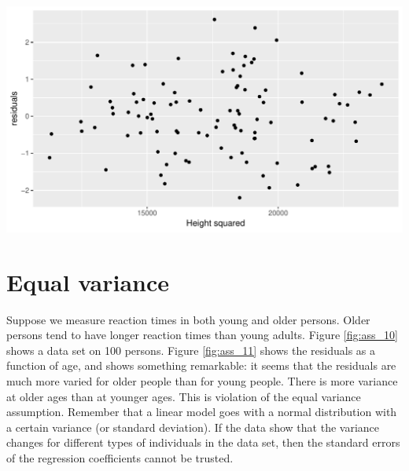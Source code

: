 \documentclass[]{report}\usepackage[]{graphicx}\usepackage[]{color}
\makeatletter
\def\maxwidth{ %
  \ifdim\Gin@nat@width>\linewidth
    \linewidth
  \else
    \Gin@nat@width
  \fi
}
\newenvironment{knitrout}{}{} %
\makeatother
\begin{document}
\begin{knitrout}
\color{fgcolor}

{\centering \includegraphics[width=\maxwidth]{figure/ass_9-1} 

}



\end{knitrout}



\section{Equal variance}

Suppose we measure reaction times in both young and older persons. Older persons tend to have longer reaction times than young adults. Figure \ref{fig:ass_10} shows a data set on 100 persons. Figure \ref{fig:ass_11} shows the residuals as a function of age, and shows something remarkable: it seems that the residuals are much more varied for older people than for young people. There is more variance at older ages than at younger ages. This is violation of the equal variance assumption. Remember that a linear model goes with a normal distribution with a certain variance (or standard deviation). If the data show that the variance changes for different types of individuals in the data set, then the standard errors of the regression coefficients cannot be trusted. 
\end{document}
